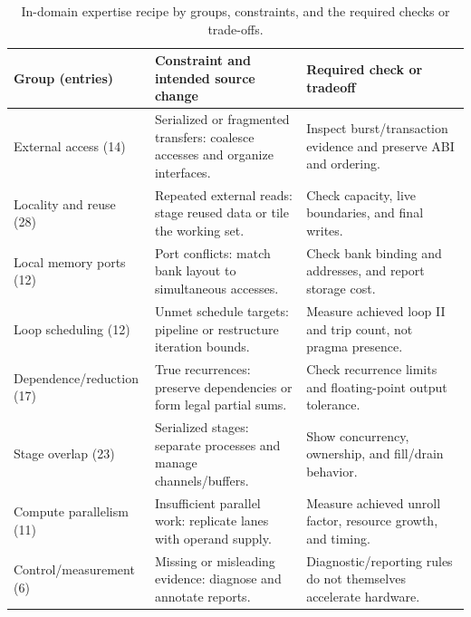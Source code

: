 \begin{table}[t]
\centering
\caption{
In-domain expertise recipe by groups, constraints, and the required checks or trade-offs.
}
\label{tab:architectural-expertise}
\small
\setlength{\tabcolsep}{4pt}
\begin{tabularx}{\linewidth}{@{}Y{0.78}Y{1.22}Y{1.0}@{}}
\toprule
Group (entries) & Constraint and intended source change & Required check or tradeoff \\
\midrule
External access (14) & Serialized or fragmented transfers: coalesce accesses and organize interfaces. & Inspect burst/transaction evidence and preserve ABI and ordering. \\
Locality and reuse (28) & Repeated external reads: stage reused data or tile the working set. & Check capacity, live boundaries, and final writes. \\
Local memory ports (12) & Port conflicts: match bank layout to simultaneous accesses. & Check bank binding and addresses, and report storage cost. \\
Loop scheduling (12) & Unmet schedule targets: pipeline or restructure iteration bounds. & Measure achieved loop II and trip count, not pragma presence. \\
Dependence/reduction (17) & True recurrences: preserve dependencies or form legal partial sums. & Check recurrence limits and floating-point output tolerance. \\
Stage overlap (23) & Serialized stages: separate processes and manage channels/buffers. & Show concurrency, ownership, and fill/drain behavior. \\
Compute parallelism (11) & Insufficient parallel work: replicate lanes with operand supply. & Measure achieved unroll factor, resource growth, and timing. \\
Control/measurement (6) & Missing or misleading evidence: diagnose and annotate reports. & Diagnostic/reporting rules do not themselves accelerate hardware. \\
\bottomrule
\end{tabularx}
\end{table}
